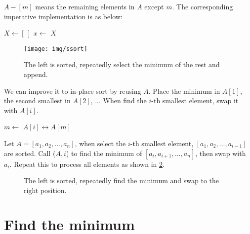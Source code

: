 \documentclass[b5paper]{article}
\begin{document}
$A - [m]$ means the remaining elements in $A$ except $m$. The corresponding imperative implementation is as below:

\begin{algorithmic}[1]
  \State $X \gets [\ ]$
    \State $x \gets$ 
    \State {}
    \State {}
  \EndWhile
  \State \Return $X$
\EndFunction
\end{algorithmic}

\begin{figure}[htbp]
  \centering
  \texttt{[image: img/ssort]}
  \caption{The left is sorted, repeatedly select the minimum of the rest and append.}
  \label{fig:sel-sort}
\end{figure}

We can improve it to in-place sort by reusing $A$. Place the minimum in $A[1]$, the second smallest in $A[2]$, ... When find the $i$-th smallest element, swap it with $A[i]$.

\begin{algorithmic}[1]
    \State $m \gets$ 
    \State {} $A[i] \leftrightarrow A[m]$
  \EndFor
\EndFunction
\end{algorithmic}

Let $A = [a_1, a_2, ..., a_n]$, when select the $i$-th smallest element, $[a_1, a_2, ..., a_{i-1}]$ are sorted. Call ($A, i$) to find the minimum of $[a_i, a_{i+1}, ..., a_n]$, then swap with $a_i$. Repeat this to process all elements as shown in \cref{fig:in-place-ssort}.

\begin{figure}[htbp]
  \centering
  \caption{The left is sorted, repeatedly find the minimum and swap to the right position.}
  \label{fig:in-place-ssort}
\end{figure}

\section{Find the minimum}
\end{document}
